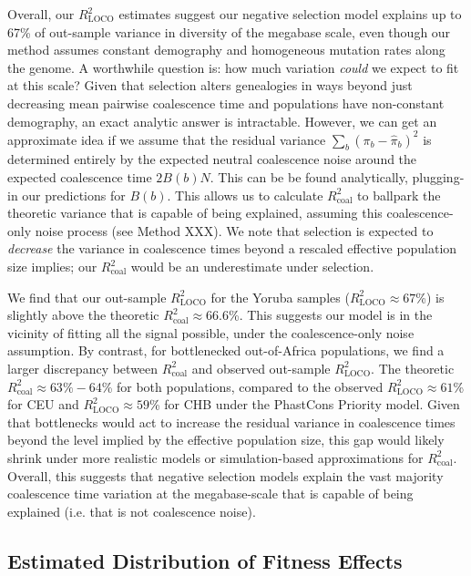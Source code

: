 \documentclass[11pt]{article}
\begin{document}
Overall, our $R_\text{LOCO}^2$ estimates suggest our negative selection model
explains up to 67\% of out-sample variance in diversity of the megabase scale,
even though our method assumes constant demography and homogeneous mutation
rates along the genome. A worthwhile question is: how much variation
\emph{could} we expect to fit at this scale? Given that selection alters
genealogies in ways beyond just decreasing mean pairwise coalescence time and
populations have non-constant demography, an exact analytic answer is
intractable. However, we can get an approximate idea if we assume that the
residual variance $\sum_b (\pi_b - \widehat{\pi}_b)^2$ is determined entirely
by the expected neutral coalescence noise around the expected coalescence time
$2B(b)N$. This can be be found analytically, plugging-in our predictions for
$B(b)$. This allows us to calculate $R_\text{coal}^2$ to ballpark the theoretic
variance that is capable of being explained, assuming this coalescence-only
noise process (see Method XXX). We note that selection is expected to
\emph{decrease} the variance in coalescence times beyond a rescaled effective
population size implies; our $R_\text{coal}^2$ would be an underestimate under
selection.

We find that our out-sample $R_\text{LOCO}^2$ for the Yoruba samples
($R_\text{LOCO}^2 \approx 67$\%) is slightly above the theoretic
$R_\text{coal}^2 \approx 66.6$\%. This suggests our model is in the vicinity of
fitting all the signal possible, under the coalescence-only noise assumption.
By contrast, for bottlenecked out-of-Africa populations, we find a larger
discrepancy between $R_\text{coal}^2$ and observed out-sample
$R_\text{LOCO}^2$. The theoretic $R_\text{coal}^2 \approx 63\%-64$\% for both
populations, compared to the observed $R_\text{LOCO}^2 \approx 61$\% for CEU
and $R_\text{LOCO}^2 \approx 59$\% for CHB under the PhastCons Priority model.
Given that bottlenecks would act to increase the residual variance in
coalescence times beyond the level implied by the effective population size,
this gap would likely shrink under more realistic models or simulation-based
approximations for $R_\text{coal}^2$. Overall, this suggests that negative
selection models explain the vast majority coalescence time variation at the
megabase-scale that is capable of being explained (i.e. that is not coalescence
noise).

\subsection*{Estimated Distribution of Fitness Effects}
\end{document}
